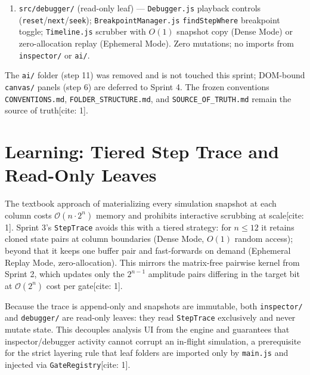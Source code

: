 \documentclass[conference]{IEEEtran}
\begin{document}
\begin{enumerate}
    \item \texttt{src/debugger/} (read-only leaf) --- \texttt{Debugger.js} playback controls (\texttt{reset}/\texttt{next}/\texttt{seek}); \texttt{BreakpointManager.js} \texttt{findStepWhere} breakpoint toggle; \texttt{Timeline.js} scrubber with $O(1)$ snapshot copy (Dense Mode) or zero-allocation replay (Ephemeral Mode). Zero mutations; no imports from \texttt{inspector/} or \texttt{ai/}.
\end{enumerate}

The \texttt{ai/} folder (step 11) was removed and is not touched this sprint; DOM-bound \texttt{canvas/} panels (step 6) are deferred to Sprint 4. The frozen conventions \texttt{CONVENTIONS.md}, \texttt{FOLDER\_STRUCTURE.md}, and \texttt{SOURCE\_OF\_TRUTH.md} remain the source of truth[cite: 1].

\section{Learning: Tiered Step Trace and Read-Only Leaves}
The textbook approach of materializing every simulation snapshot at each column costs $\mathcal{O}(n\cdot 2^n)$ memory and prohibits interactive scrubbing at scale[cite: 1]. Sprint 3's \texttt{StepTrace} avoids this with a tiered strategy: for $n\le12$ it retains cloned state pairs at column boundaries (Dense Mode, $O(1)$ random access); beyond that it keeps one buffer pair and fast-forwards on demand (Ephemeral Replay Mode, zero-allocation)\cite{1}. This mirrors the matrix-free pairwise kernel from Sprint 2, which updates only the $2^{n-1}$ amplitude pairs differing in the target bit at $\mathcal{O}(2^n)$ cost per gate[cite: 1].

Because the trace is append-only and snapshots are immutable, both \texttt{inspector/} and \texttt{debugger/} are read-only leaves: they read \texttt{StepTrace} exclusively and never mutate state. This decouples analysis UI from the engine and guarantees that inspector/debugger activity cannot corrupt an in-flight simulation, a prerequisite for the strict layering rule that leaf folders are imported only by \texttt{main.js} and injected via \texttt{GateRegistry}[cite: 1].
\end{document}
